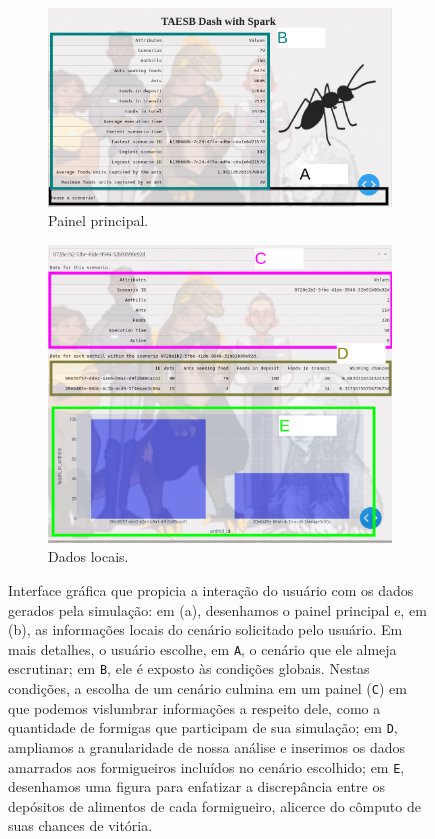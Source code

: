 \documentclass[12pt,oneside,a4paper]{article}
\begin{document}
\begin{figure} 
	\centering 
	\begin{subfigure}{.49\textwidth} 
		\centering 
		\includegraphics[width=\textwidth]{images/panel_paint.png} 
		\caption{Painel principal.} 
	\end{subfigure} 
	\begin{subfigure}{.49\textwidth}  
		\centering    
		\includegraphics[width=\textwidth]{images/scenarios_paint.png} 
		\caption{Dados locais.} 
	\end{subfigure} 
	\caption{Interface gráfica que propicia a interação do usuário com os dados gerados pela simulação: em (a), desenhamos o painel principal e, em (b), as informações locais do cenário solicitado pelo usuário. Em mais detalhes, o usuário escolhe, em \texttt{A}, o cenário que ele almeja escrutinar; em \texttt{B}, ele é exposto às condições globais. Nestas condições, a escolha de um cenário culmina em um painel (\texttt{C}) em que podemos vislumbrar informações a respeito dele, como a quantidade de formigas que participam de sua simulação; em \texttt{D}, ampliamos a granularidade de nossa análise e inserimos os dados amarrados aos formigueiros incluídos no cenário escolhido; em \texttt{E}, desenhamos uma figura para enfatizar a discrepância entre os depósitos de alimentos de cada formigueiro, alicerce do cômputo de suas chances de vitória.} 
\end{figure} 
\end{document}
